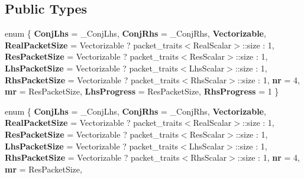 \subsection*{Public Types}
\begin{DoxyCompactItemize}
\item 
\mbox{\label{class_eigen_1_1internal_1_1gebp__traits_3_01std_1_1complex_3_01_real_scalar_01_4_00_01std_1_1com3fbe501975c876a010def81ad2701521_a813e253b1191ba29eec5d45c92162da7}} 
enum \{ \newline
{\bfseries Conj\+Lhs} = \+\_\+\+Conj\+Lhs, 
{\bfseries Conj\+Rhs} = \+\_\+\+Conj\+Rhs, 
{\bfseries Vectorizable}, 
{\bfseries Real\+Packet\+Size} = Vectorizable ? packet\+\_\+traits$<$Real\+Scalar$>$\+:\+:size \+: 1, 
\newline
{\bfseries Res\+Packet\+Size} = Vectorizable ? packet\+\_\+traits$<$Res\+Scalar$>$\+:\+:size \+: 1, 
{\bfseries Lhs\+Packet\+Size} = Vectorizable ? packet\+\_\+traits$<$Lhs\+Scalar$>$\+:\+:size \+: 1, 
{\bfseries Rhs\+Packet\+Size} = Vectorizable ? packet\+\_\+traits$<$Rhs\+Scalar$>$\+:\+:size \+: 1, 
{\bfseries nr} = 4, 
\newline
{\bfseries mr} = Res\+Packet\+Size, 
{\bfseries Lhs\+Progress} = Res\+Packet\+Size, 
{\bfseries Rhs\+Progress} = 1
 \}
\item 
\mbox{\label{class_eigen_1_1internal_1_1gebp__traits_3_01std_1_1complex_3_01_real_scalar_01_4_00_01std_1_1com3fbe501975c876a010def81ad2701521_a9cd128ec4c10bfed1947fa70271e67ac}} 
enum \{ \newline
{\bfseries Conj\+Lhs} = \+\_\+\+Conj\+Lhs, 
{\bfseries Conj\+Rhs} = \+\_\+\+Conj\+Rhs, 
{\bfseries Vectorizable}, 
{\bfseries Real\+Packet\+Size} = Vectorizable ? packet\+\_\+traits$<$Real\+Scalar$>$\+:\+:size \+: 1, 
\newline
{\bfseries Res\+Packet\+Size} = Vectorizable ? packet\+\_\+traits$<$Res\+Scalar$>$\+:\+:size \+: 1, 
{\bfseries Lhs\+Packet\+Size} = Vectorizable ? packet\+\_\+traits$<$Lhs\+Scalar$>$\+:\+:size \+: 1, 
{\bfseries Rhs\+Packet\+Size} = Vectorizable ? packet\+\_\+traits$<$Rhs\+Scalar$>$\+:\+:size \+: 1, 
{\bfseries nr} = 4, 
\newline
{\bfseries mr} = Res\+Packet\+Size, 

\end{DoxyCompactItemize}
